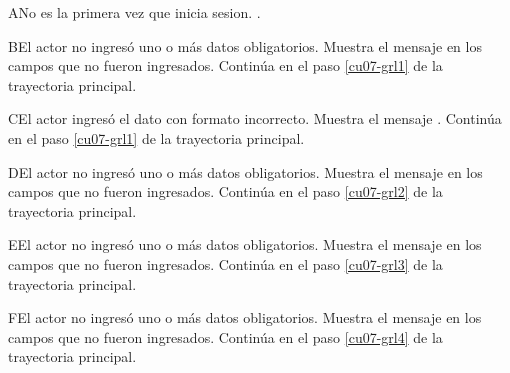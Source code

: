 \begin{UCtrayectoriaA}{A}{No es la primera vez que inicia sesion.}
	.
\end{UCtrayectoriaA} 

\begin{UCtrayectoriaA}{B}{El actor no ingresó uno o más datos obligatorios.}
	\UCpaso [\UCsist] Muestra el mensaje  en los campos que no
	fueron ingresados.
	\UCpaso [\UCsist] Continúa en el paso \ref{cu07-grl1} de la trayectoria principal.
\end{UCtrayectoriaA} 

\begin{UCtrayectoriaA}{C}{El actor ingresó el dato con formato incorrecto.}
	\UCpaso [\UCsist] Muestra el mensaje .
	\UCpaso [\UCsist] Continúa en el paso \ref{cu07-grl1} de la trayectoria principal.
\end{UCtrayectoriaA}

\begin{UCtrayectoriaA}{D}{El actor no ingresó uno o más datos obligatorios.}
	\UCpaso [\UCsist] Muestra el mensaje  en los campos que no
	fueron ingresados.
	\UCpaso [\UCsist] Continúa en el paso \ref{cu07-grl2} de la trayectoria principal.
\end{UCtrayectoriaA} 

\begin{UCtrayectoriaA}{E}{El actor no ingresó uno o más datos obligatorios.}
	\UCpaso [\UCsist] Muestra el mensaje  en los campos que no
	fueron ingresados.
	\UCpaso [\UCsist] Continúa en el paso \ref{cu07-grl3} de la trayectoria principal.
\end{UCtrayectoriaA} 

\begin{UCtrayectoriaA}{F}{El actor no ingresó uno o más datos obligatorios.}
	\UCpaso [\UCsist] Muestra el mensaje  en los campos que no
	fueron ingresados.
	\UCpaso [\UCsist] Continúa en el paso \ref{cu07-grl4} de la trayectoria principal.
\end{UCtrayectoriaA} 

